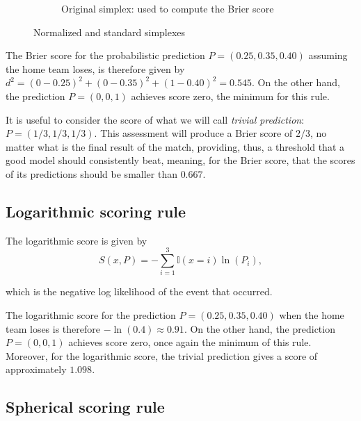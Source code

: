 \documentclass[journal,article,accept,moreauthors,pdftex,12pt,a4paper]{mdpi}
\begin{document}
\begin{figure}[!ht]
\begin{subfigure}[b]{0.48\linewidth}
			
			
			\caption{Original simplex: used to compute the Brier score}
			\label{fig:B}
		\end{subfigure}
		\caption{Normalized and standard simplexes}
		\label{fig:norm_stand}
	\end{figure}
	
	The Brier score for the probabilistic prediction $P=(0.25,0.35,0.40)$
	assuming the home team loses, is therefore given by $d^2=(0-0.25)^2+(0-0.35)^2+(1-0.40)^2=0.545$. 
	On the other hand, the prediction $P=(0,0,1)$ achieves score  zero, the minimum for this rule.
	
	It is useful to consider the score of what we will call {\it trivial prediction}:
	$P=(1/3,1/3,1/3)$.
	This assessment will produce a Brier score of $2/3$, no matter what is the final result of the match, providing, thus, a threshold that a good model should consistently beat, meaning, for the Brier score, that the scores of its predictions should be smaller than $0.667$.  
	
	
	
	\subsection{Logarithmic scoring rule}
	
	The logarithmic  score is given by
	$$S(x,P)=- \sum_{i=1}^3\mathbb{I}(x=i)\ln(P_i),$$
	
	\noindent
	which is the negative log likelihood of the event that occurred.
	
	The logarithmic score for the prediction 
	$P=(0.25,0.35,0.40)$
		 when the home team loses is therefore 
	$-\ln(0.4)\approx 0.91$. 
	On the other hand, the prediction $P=(0,0,1)$ achieves score zero, once again the minimum of this rule.
	Moreover, for the logarithmic score, the trivial prediction gives a score of approximately $1.098$.
	
	\subsection{Spherical scoring rule}
	
\end{document}
